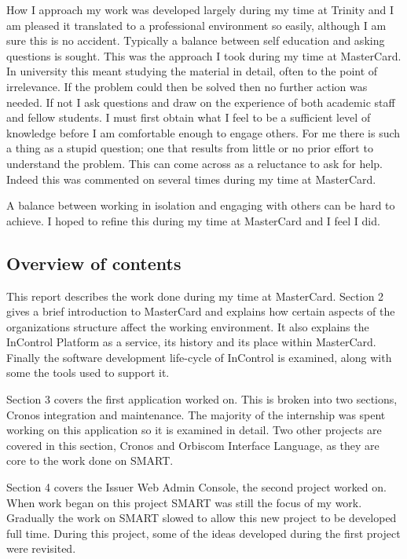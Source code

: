 \documentclass[a4paper, 11pt, titlepage]{article}
\begin{document}
How I approach my work was developed largely during my time at Trinity and I am pleased it translated to a professional environment so easily, although I am sure this is no accident. Typically a balance between self education and asking questions is sought. This was the approach I took during my time at MasterCard. In university this meant studying the material in detail, often to the point of irrelevance. If the problem could then be solved then no further action was needed. If not I ask questions and draw on the experience of both academic staff and fellow students. I must first obtain what I feel to be a sufficient level of knowledge before I am comfortable enough to engage others. For me there is such a thing as a stupid question; one that results from little or no prior effort to understand the problem. This can come across as a reluctance to ask for help. Indeed this was commented on several times during my time at MasterCard.

A balance between working in isolation and engaging with others can be hard to achieve. I hoped to refine this during my time at MasterCard and I feel I did.

 
\subsection{Overview of contents}

This report describes the work done during my time at MasterCard. Section 2 gives a brief introduction to MasterCard and explains how certain aspects of the organizations structure affect the working environment. It also explains the InControl Platform as a service, its history and its place within MasterCard. Finally the software development life-cycle of InControl is examined, along with some the tools used to support it.

Section 3 covers the first application worked on. This is broken into two sections, Cronos integration and maintenance. The majority of the internship was spent working on this application so it is examined in detail. Two other projects are covered in this section, Cronos and Orbiscom Interface Language, as they are core to the work done on SMART.

Section 4 covers the Issuer Web Admin Console, the second project worked on. When work began on this project SMART was still the focus of my work. Gradually the work on SMART slowed to allow this new project to be developed full time. During this project, some of the ideas developed during the first project were revisited.
\end{document}
